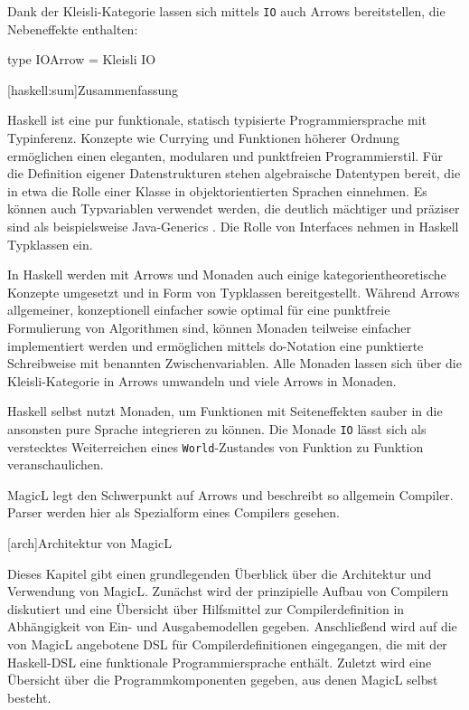 \documentclass[12pt, a4paper, bibgerm]{scrbook}
\newenvironment{DIFnomarkup}{}{}
\newcommand\icode[1]{\lstinline?#1?}
\newcommand\lchapter{}
\newcommand\lsection{}
\begin{document}
Dank der Kleisli-Kategorie lassen sich mittels \icode{IO} auch Arrows
bereitstellen, die Nebeneffekte enthalten:
\begin{DIFnomarkup}\begin{code}
type IOArrow = Kleisli IO
\end{code}\end{DIFnomarkup}

\lsection[haskell:sum]{Zusammenfassung}

Haskell ist eine pur funktionale, statisch typisierte Programmiersprache
mit Typinferenz. Konzepte wie Currying und Funktionen höherer Ordnung
ermöglichen einen eleganten, modularen und punktfreien
Programmierstil. Für die Definition eigener Datenstrukturen stehen
algebraische Datentypen bereit, die in etwa die Rolle einer Klasse in
objektorientierten Sprachen einnehmen. Es können auch Typvariablen
verwendet werden, die deutlich mächtiger und präziser sind als
beispielsweise Java-Generics \cite{JavaGenerics}. Die Rolle von
Interfaces nehmen in Haskell Typklassen ein.

In Haskell werden mit Arrows und Monaden auch einige
kategorientheoretische Konzepte umgesetzt und in Form von Typklassen
bereitgestellt. Während Arrows allgemeiner, konzeptionell einfacher sowie
optimal für eine punktfreie Formulierung von Algorithmen sind, können
Monaden teilweise einfacher implementiert werden und ermöglichen mittels
do-Notation eine punktierte Schreibweise mit benannten
Zwischenvariablen. Alle Monaden lassen sich über die Kleisli-Kategorie
in Arrows umwandeln und viele Arrows in Monaden.

Haskell selbst nutzt Monaden, um Funktionen mit Seiteneffekten sauber in
die ansonsten pure Sprache integrieren zu können. Die Monade \icode{IO}
lässt sich als verstecktes Weiterreichen eines \icode{World}-Zustandes von
Funktion zu Funktion veranschaulichen.

MagicL legt den Schwerpunkt auf Arrows und beschreibt so allgemein
Compiler. Parser werden hier als Spezialform eines Compilers gesehen.

\lchapter[arch]{Architektur von MagicL}

Dieses Kapitel gibt einen grundlegenden Überblick über die Architektur
und Verwendung von MagicL. Zunächst wird der prinzipielle Aufbau von
Compilern diskutiert und eine Übersicht über Hilfsmittel zur
Compilerdefinition in Abhängigkeit von Ein- und Ausgabemodellen
gegeben. Anschließend wird auf die von MagicL angebotene DSL für
Compilerdefinitionen eingegangen, die mit der Haskell-DSL eine
funktionale Programmiersprache enthält. Zuletzt wird eine Übersicht über
die Programmkomponenten gegeben, aus denen MagicL selbst besteht.
\end{document}
